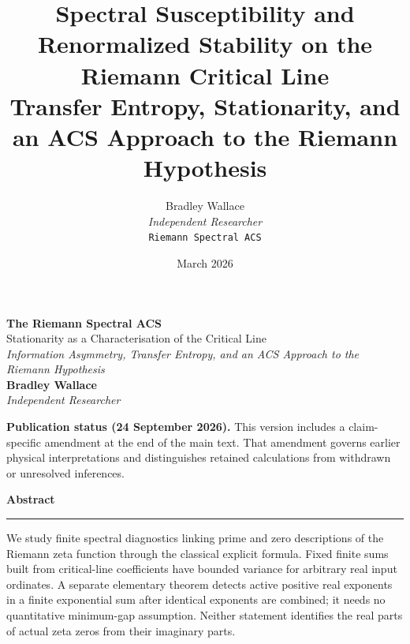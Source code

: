 \documentclass[11pt,a4paper]{article}
\title{\textbf{Spectral Susceptibility and Renormalized Stability on the Riemann Critical Line}\\[0.4em]
       \large Transfer Entropy, Stationarity, and an ACS Approach to the Riemann Hypothesis}
\author{Bradley Wallace\\[0.3em]
        \small \textit{Independent Researcher}\\[0.2em]
        \small \texttt{Riemann Spectral ACS}}
\date{March 2026}
\theoremstyle{plain}
\theoremstyle{definition}
\theoremstyle{remark}
\begin{document}
\begin{titlepage}
\thispagestyle{empty}

\noindent{\color{acsrule}\rule{\textwidth}{0.4pt}}
\vspace{6pt}
\vspace{6pt}
\noindent{\color{acsrule}\rule{\textwidth}{0.4pt}}

\vspace{0.6in}

\begin{center}
  {\Huge\bfseries\color{acsprimary} The Riemann Spectral ACS}\\[0.4em]
  {\Large\color{acsslate} Stationarity as a Characterisation of the Critical Line}\\[1.2em]
  {\normalsize\itshape\color{acsslate}
    Information Asymmetry, Transfer Entropy, and an ACS Approach to the Riemann Hypothesis}\\[2.0em]
  {\large\bfseries Bradley Wallace}\\[0.25em]
  {\small\itshape\color{acsslate} Independent Researcher}
\end{center}
\par\smallskip\noindent\textbf{Publication status (24 September 2026).}
This version includes a claim-specific amendment at the end of the main text.
That amendment governs earlier physical interpretations and distinguishes
retained calculations from withdrawn or unresolved inferences.\par\smallskip


\vspace{0.5in}

\begin{center}
\begin{minipage}{0.88\textwidth}
\begin{center}
  {\bfseries\color{acsprimary}\large Abstract}\\[0.3em]
  {\color{acsrule}\rule{1.2in}{0.3pt}}
\end{center}
\vspace{0.5em}
\small\noindent
We study finite spectral diagnostics linking prime and zero descriptions of
the Riemann zeta function through the classical explicit formula. Fixed
finite sums built from critical-line coefficients have bounded variance
for arbitrary real input ordinates. A separate elementary theorem detects
active positive real exponents in a finite exponential sum after identical
exponents are combined; it needs no quantitative minimum-gap assumption.
Neither statement identifies the real parts of actual zeta zeros from
their imaginary parts.


\end{minipage}
\end{center}
\end{titlepage}
\end{document}
